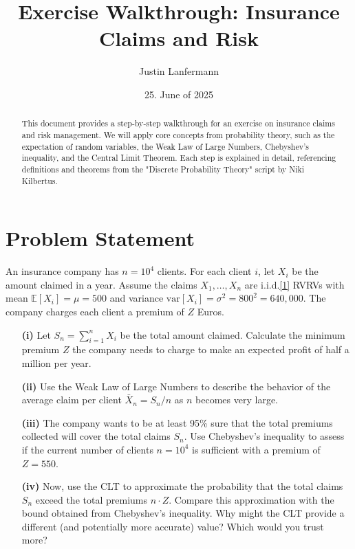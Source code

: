 \documentclass[11pt,a4paper]{article}
\title{Exercise Walkthrough: Insurance Claims and Risk}
\author{Justin Lanfermann}
\date{25. June of 2025}
\begin{document}
\maketitle

\begin{abstract}
    This document provides a step-by-step walkthrough for an exercise on insurance claims and risk management. We will apply core concepts from probability theory, such as the expectation of random variables, the Weak Law of Large Numbers, Chebyshev's inequality, and the Central Limit Theorem. Each step is explained in detail, referencing definitions and theorems from the "Discrete Probability Theory" script by Niki Kilbertus.
\end{abstract}

\section{Problem Statement}

An insurance company has $n=10^4$ clients. For each client $i$, let $X_i$ be the amount claimed in a year. Assume the claims $X_1, \dots, X_n$ are i.i.d.\hyperlink{note1}{[1]} RVRVs with mean $\mathbb{E}[X_i] = \mu = 500$ and variance $\text{var}[X_i] = \sigma^2 = 800^2 = 640,000$. The company charges each client a premium of $Z$ Euros.

\begin{enumerate}
    \item[\textbf{(i)}] Let $S_n = \sum_{i=1}^n X_i$ be the total amount claimed. Calculate the minimum premium $Z$ the company needs to charge to make an expected profit of half a million per year.
    \item[\textbf{(ii)}] Use the Weak Law of Large Numbers to describe the behavior of the average claim per client $\bar{X}_n = S_n/n$ as $n$ becomes very large.
    \item[\textbf{(iii)}] The company wants to be at least 95\% sure that the total premiums collected will cover the total claims $S_n$. Use Chebyshev’s inequality to assess if the current number of clients $n=10^4$ is sufficient with a premium of $Z=550$.
    \item[\textbf{(iv)}] Now, use the CLT to approximate the probability that the total claims $S_n$ exceed the total premiums $n \cdot Z$. Compare this approximation with the bound obtained from Chebyshev’s inequality. Why might the CLT provide a different (and potentially more accurate) value? Which would you trust more?
\end{enumerate}
\end{document}
